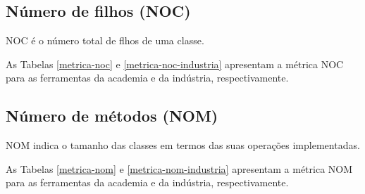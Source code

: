 \subsection{Número de filhos (NOC)}

NOC é o número total de flhos de uma classe.

As Tabelas \ref{metrica-noc} e \ref{metrica-noc-industria} apresentam a
métrica NOC para as ferramentas da academia e da indústria, respectivamente.



\subsection{Número de métodos (NOM)}

NOM indica o tamanho das classes em termos das suas operações implementadas.

As Tabelas \ref{metrica-nom} e \ref{metrica-nom-industria} apresentam a
métrica NOM para as ferramentas da academia e da indústria, respectivamente.



